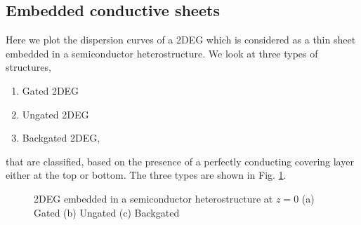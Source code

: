 \subsection{Embedded conductive sheets}
%
%
Here we plot the dispersion curves of a 2DEG which is considered as a thin sheet embedded in a semiconductor heterostructure. We look at three types of structures,
%
\begin{enumerate}
  \item Gated 2DEG
  \item Ungated 2DEG
  \item Backgated 2DEG,
\end{enumerate}
%
that are classified, based on the presence of a perfectly conducting covering layer either at the top or bottom. The three types are shown in Fig. \ref{fig:2deg_structure_types}.
%
\begin{figure}[!htbp]
   \hfil
   \hfil
   \hfil
  \caption{2DEG embedded in a semiconductor heterostructure at $z=0$ (a) Gated  (b) Ungated (c) Backgated}
  \label{fig:2deg_structure_types}
\end{figure}
%

